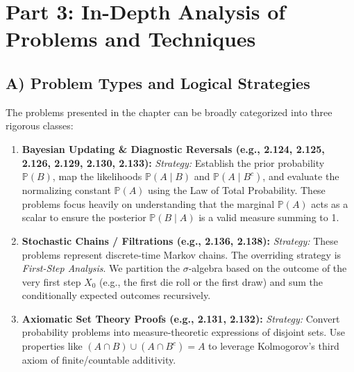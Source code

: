 \documentclass[12pt]{article}
\theoremstyle{definition}
\theoremstyle{remark}
\newcommand{\Pbb}{\mathbb{P}}
\begin{document}
\newpage
\section{Part 3: In-Depth Analysis of Problems and Techniques}

\subsection{A) Problem Types and Logical Strategies}
The problems presented in the chapter can be broadly categorized into three rigorous classes:
\begin{enumerate}
    \item \textbf{Bayesian Updating \& Diagnostic Reversals (e.g., 2.124, 2.125, 2.126, 2.129, 2.130, 2.133):} 
    \textit{Strategy:} Establish the prior probability $\Pbb(B)$, map the likelihoods $\Pbb(A \mid B)$ and $\Pbb(A \mid B^c)$, and evaluate the normalizing constant $\Pbb(A)$ using the Law of Total Probability. These problems focus heavily on understanding that the marginal $\Pbb(A)$ acts as a scalar to ensure the posterior $\Pbb(B \mid A)$ is a valid measure summing to 1.
    
    \item \textbf{Stochastic Chains / Filtrations (e.g., 2.136, 2.138):}
    \textit{Strategy:} These problems represent discrete-time Markov chains. The overriding strategy is \textit{First-Step Analysis}. We partition the $\sigma$-algebra based on the outcome of the very first step $X_0$ (e.g., the first die roll or the first draw) and sum the conditionally expected outcomes recursively. 
    
    \item \textbf{Axiomatic Set Theory Proofs (e.g., 2.131, 2.132):}
    \textit{Strategy:} Convert probability problems into measure-theoretic expressions of disjoint sets. Use properties like $(A \cap B) \cup (A \cap B^c) = A$ to leverage Kolmogorov's third axiom of finite/countable additivity.
\end{enumerate}
\end{document}
